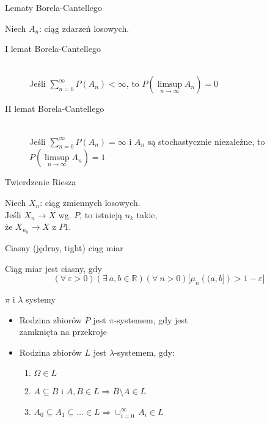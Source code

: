 \documentclass[avery5371,grid,frame]{flashcards}
\begin{document}


\begin{flashcard}[Twierdzenie]{Lematy Borela-Cantellego}

\smallskip
Niech $A_n$: ciąg zdarzeń losowych.
\begin{description}
\item[I lemat Borela-Cantellego] \hfill \\
	Jeśli $\sum_{n=0}^{\infty} P(A_n) < \infty$, to $P\left(\limsup\limits_{n \rightarrow \infty}{A_n}\right)=0$
\item[II lemat Borela-Cantellego] \hfill \\
	Jeśli $\sum_{n=0}^{\infty} P(A_n) = \infty$ i $A_n$ są stochastycznie niezależne, to $P\left(\limsup\limits_{n \rightarrow \infty}{A_n}\right)=1$ 
\end{description}
\end{flashcard}

\begin{flashcard}[Twierdzenie]{Twierdzenie Riesza}

\smallskip
Niech $X_n$: ciąg zmiennych losowych. \\ 
Jeśli $X_n \rightarrow X$ wg. $P$, to istnieją $n_k$ takie, \\
że $X_{n_k} \rightarrow X$ z $P1$.
\end{flashcard}

\begin{flashcard}[Definicja]{Ciasny (jędrny, tight) ciąg miar}

\smallskip
Ciąg miar jest ciasny, gdy
$$ (\forall \ \varepsilon > 0)(\exists \ a, b \in \mathbb{R})(\forall \ n > 0) \Big[\mu_n \left( (a,b] \right) > 1-\varepsilon \Big] $$
\end{flashcard}

\begin{flashcard}[Definicja]{$\pi$ i $\lambda$ systemy}

\smallskip
\begin{itemize}
\item Rodzina zbiorów $\mathit{P}$ jest $\pi$-systemem, gdy jest \\
zamknięta na przekroje
\item Rodzina zbiorów $\mathit{L}$ jest $\lambda$-systemem, gdy:
	\begin{enumerate}
	\item $\Omega \in \mathit{L}$
	\item $A \subseteq B$ i $A, B \in \mathit{L} \Rightarrow B \setminus A \in \mathit{L}$
	\item $A_0 \subseteq A_1 \subseteq \ldots \in \mathit{L} \Rightarrow \cup^{\infty}_{i=0} \ A_i \in \mathit{L}$
	\end{enumerate}

\end{itemize}
\end{flashcard}
\end{document}
